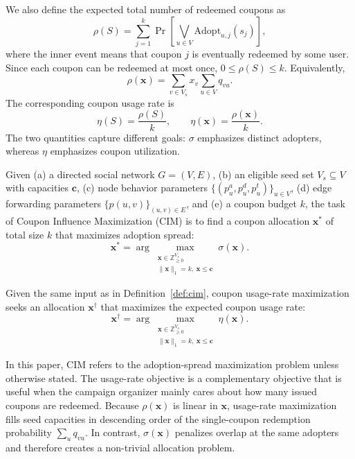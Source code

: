\documentclass[sigconf,balance=false]{acmart}
\begin{document}
We also define the expected total number of redeemed coupons as
\[
  \rho(S) =
  \sum_{j=1}^{k}
    \Pr\!\left[\bigvee_{u\in V} \mathrm{Adopt}_{u,j}(s_j)\right],
\]
where the inner event means that coupon $j$ is eventually redeemed by
some user.
Since each coupon can be redeemed at most once, $0\leq\rho(S)\leq k$.
Equivalently,
\[
  \rho(\bm{x})=\sum_{v\in V_s}x_v\sum_{u\in V}q_{vu}.
\]
The corresponding coupon usage rate is
\[
  \eta(S)=\frac{\rho(S)}{k},
  \qquad
  \eta(\bm{x})=\frac{\rho(\bm{x})}{k}.
\]
The two quantities capture different goals: $\sigma$ emphasizes distinct
adopters, whereas $\eta$ emphasizes coupon utilization.

\begin{definition}
\label{def:cim}
Given (a) a directed social network $G=(V,E)$, (b) an eligible seed set
$V_s\subseteq V$ with capacities $\bm{c}$, (c) node behavior parameters
$\{(p_u^a,p_u^d,p_u^t)\}_{u\in V}$, (d) edge forwarding parameters
$\{p(u,v)\}_{(u,v)\in E}$, and (e) a coupon budget $k$, the
task of Coupon Influence Maximization (CIM) is to find a coupon allocation
$\bm{x}^*$ of total size $k$ that maximizes adoption spread:
\[
  \bm{x}^*=\arg\max_{\substack{\bm{x}\in\mathbb{Z}_{\geq0}^{V_s}\\
  \|\bm{x}\|_1=k,\ \bm{x}\leq\bm{c}}}\sigma(\bm{x}).
\]
\end{definition}

\begin{definition}
\label{def:usage-rate}
Given the same input as in Definition~\ref{def:cim}, coupon usage-rate
maximization seeks an allocation $\bm{x}^\dagger$ that
maximizes the expected coupon usage rate:
\[
  \bm{x}^\dagger =
  \arg\max_{\substack{\bm{x}\in\mathbb{Z}_{\geq0}^{V_s}\\
  \|\bm{x}\|_1=k,\ \bm{x}\leq\bm{c}}}
  \eta(\bm{x}).
\]
\end{definition}

In this paper, CIM refers to the adoption-spread maximization problem
unless otherwise stated.
The usage-rate objective is a complementary objective that is useful
when the campaign organizer mainly cares about how many issued coupons are
redeemed.
Because $\rho(\bm{x})$ is linear in $\bm{x}$, usage-rate maximization
fills seed capacities in descending order of the single-coupon redemption
probability $\sum_u q_{vu}$.
In contrast, $\sigma(\bm{x})$ penalizes overlap at the same adopters and
therefore creates a non-trivial allocation problem.
\end{document}

